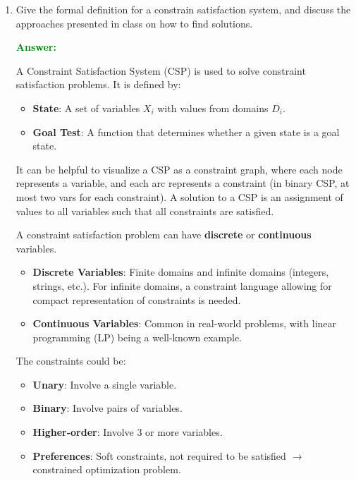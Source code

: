\documentclass[12pt]{article}
\begin{document}
\begin{enumerate}
    \item Give the formal definition for a constrain satisfaction system, and discuss the approaches presented in class on how to find solutions.

          \textcolor{green}{\textbf{Answer:}}

          A Constraint Satisfaction System (CSP) is used to solve constraint satisfaction problems. It is defined by:
          \begin{itemize}
              \item \textbf{State}: A set of variables $X_i$ with values from domains $D_i$.
              \item \textbf{Goal Test}: A function that determines whether a given state is a goal state.
          \end{itemize}

          It can be helpful to visualize a CSP as a constraint graph, where each node represents a variable, and each arc represents a constraint (in binary CSP, at most two vars for each constraint). A solution to a CSP is an assignment of values to all variables such that all constraints are satisfied.

          A constraint satisfaction problem can have \textbf{discrete} or \textbf{continuous} variables.
          \begin{itemize}
              \item \textbf{Discrete Variables}: Finite domains and infinite domains (integers, strings, etc.). For infinite domains, a constraint language allowing for compact representation of constraints is needed.
              \item \textbf{Continuous Variables}: Common in real-world problems, with linear programming (LP) being a well-known example.
          \end{itemize}

          The constraints could be:
          \begin{itemize}
              \item \textbf{Unary}: Involve a single variable.
              \item \textbf{Binary}: Involve pairs of variables.
              \item \textbf{Higher-order}: Involve 3 or more variables.
              \item \textbf{Preferences}: Soft constraints, not required to be satisfied $\rightarrow$ constrained optimization problem.
          \end{itemize}


\end{enumerate}
\end{document}

